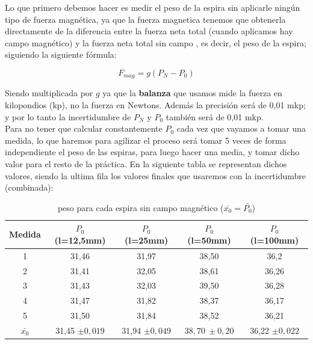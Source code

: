 \documentclass[12pt,a4paper]{book}
\begin{document}
Lo que primero debemos hacer es medir el peso de la espira sin aplicarle ningún tipo de fuerza magnética, ya que la fuerza magnetica tenemos que obtenerla directamente de la diferencia entre la fuerza neta total (cuando aplicamos hay campo magnético) y la fuerza neta total sin campo , es decir, el peso de la espira; siguiendo la siguiente fórmula:


\begin{equation}
F_{mag}=g(P_N-P_0)
\label{Ec:balanza fuerza magnetica espira}
\end{equation}

Siendo multiplicada por $g$ ya que la \textbf{balanza} que usamos mide la fuerza en kilopondios (kp), no la fuerza en Newtons. Además la precisión será de 0,01 mkp; y por lo tanto la incertidumbre de $P_N$ y $P_0$ también será de 0,01 mkp. \\

Para no tener que calcular constantemente $P_0$ cada vez que vayamos a tomar una medida, lo que haremos para agilizar el proceso será tomar 5 veces de forma independiente el peso de las espiras, para luego hacer una media, y tomar dicho valor para el resto de la práctica. En la siguiente tabla se representan dichos valores, siendo la ultima fila los valores finales que usaremos con la incertidumbre (combinada): \\ \newpage

\vspace*{1.0cm}

\begin{table}[h!]
\begin{center}
\begin{tabular}{|c|c|c|c|c|}
\hline
Medida & 	$P_0$  (l=12,5mm) & $P_0$	 (l=25mm) & $P_0$	 (l=50mm) & 	$P_0$  (l=100mm) \\  \hline
1 & 	 31,46 & 	 31,97 & 	 38,50 & 	 36,2 \\
2 & 	 31,41 & 	 32,05 & 	 38,61 & 	 36,26 \\
3 & 	 31,43 & 	 32,03 & 	 39,50 & 	 36,28 \\
4 & 	 31,47 & 	 31,82 & 	 38,37 & 	 36,17 \\
5 & 	 31,50 & 	 31,84 & 	 38,52 & 	 36,21 \\  \hline
$\bar{x_0}$ & 	 31,45 $\pm 0,019 $& 	 31,94 $\pm 0,049$ & 	 $38,70 \ \pm 0,20$ & 	 36,22 $\pm 0,022$ \\
\hline
\end{tabular}
\caption{peso para cada espira sin campo magnético ($\bar{x_0}=\bar{P_0}$)}
\label{tab:balanza medias del peso de las espiras sin campo Balanza electrodinamica}
\end{center}
\end{table}
\end{document}
